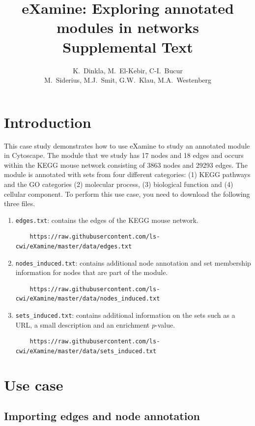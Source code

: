 \documentclass[a4paper,11pt]{article}
\title{eXamine: Exploring annotated modules in networks\\Supplemental Text}
\author{K.~Dinkla, M.~El-Kebir, C-I.~Bucur\\M.~Siderius, M.J.~Smit, G.W.~Klau,
M.A.~Westenberg}
\begin{document}
\maketitle
\tableofcontents

\section{Introduction}
This case study demonstrates how to use eXamine to study an annotated module
in Cytoscape. The module that we study has 17 nodes and 18 edges and occurs
within the KEGG mouse network consisting of 3863 nodes and 29293 edges. The
module is annotated with sets from four different categories: (1) KEGG pathways
and the GO categories (2) molecular process, (3) biological function and (4)
cellular component. To perform this use case, you need to download the following
three files. 
\begin{enumerate}
  \item \texttt{edges.txt}: contains the edges of the KEGG mouse network.
    \begin{verbatim}
    https://raw.githubusercontent.com/ls-cwi/eXamine/master/data/edges.txt
    \end{verbatim}
  \item \texttt{nodes\_induced.txt}: contains additional node annotation and
    set membership information for nodes that are part of the module.
    \begin{verbatim}
    https://raw.githubusercontent.com/ls-cwi/eXamine/master/data/nodes_induced.txt
    \end{verbatim}
  \item \texttt{sets\_induced.txt}: contains additional information on the sets
    such as a URL, a small description and an enrichment $p$-value.
    \begin{verbatim}
    https://raw.githubusercontent.com/ls-cwi/eXamine/master/data/sets_induced.txt
    \end{verbatim}
\end{enumerate}

\section{Use case}

\subsection{Importing edges and node annotation}
\end{document}

